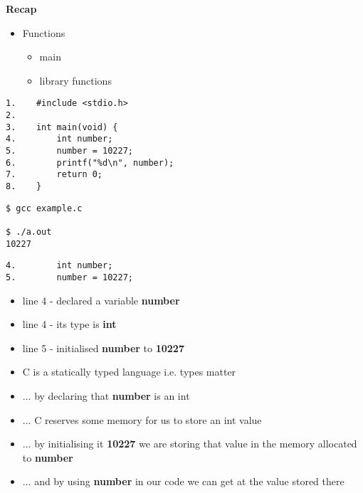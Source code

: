 \documentclass{beamer}
\begin{document}
\begin{frame}
\begin{center}
\textbf{Recap}
\end{center}
\begin{itemize}
\item Functions
\begin{itemize}
\item main
\item library functions
\end{itemize}
\end{itemize}
\end{frame}

\begin{frame}[fragile]
\begin{block}{}
\begin{lstlisting}
1.    #include <stdio.h>
2.     
3.    int main(void) {
4.        int number;
5.        number = 10227;
6.        printf("%d\n", number);
7.        return 0;
8.    }
\end{lstlisting}
\end{block}
\begin{block}{}
\begin{lstlisting}
$ gcc example.c

$ ./a.out
10227
\end{lstlisting}
\end{block}
\end{frame}

\begin{frame}[fragile]
\begin{block}{}
\begin{lstlisting}
4.        int number;
5.        number = 10227;
\end{lstlisting}
\end{block}
\begin{itemize}
\item line 4 - declared a variable \textbf{number}
\item line 4 - its type is \textbf{int}
\item line 5 - initialised \textbf{number} to \textbf{10227}
\end{itemize}
\end{frame}

\begin{frame}
\begin{itemize}
\item C is a statically typed language i.e. types matter
\item ... by declaring that \textbf{number} is an int 
\item ... C reserves some memory for us to store an int value
\item ... by initialising it \textbf{10227} we are storing that value in the memory allocated to \textbf{number}
\item ... and by using \textbf{number} in our code we can get at the value stored there
\end{itemize}
\end{frame}
\end{document}
